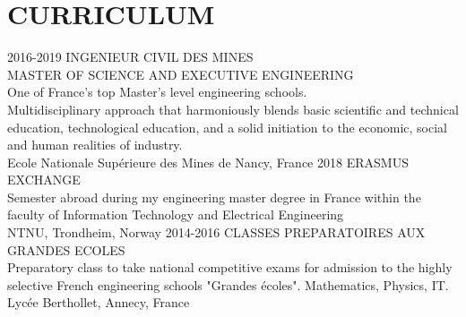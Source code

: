 \documentclass[]{cv-style}
\begin{document}
\section{CURRICULUM}
\begin{entrylist}
\entry
{2016-2019}
{INGENIEUR CIVIL DES MINES \\ MASTER OF SCIENCE AND EXECUTIVE ENGINEERING\\
{\normalfont 
    One of France's top Master’s level engineering schools. \\
    Multidisciplinary approach that harmoniously blends basic scientific and
    technical education, technological education, and a solid initiation to
    the economic, social and human realities of industry.\\
}}
{\vspace{-0.4cm}}
{ \small Ecole Nationale Supérieure des Mines 
de Nancy, France}
\entry
{2018}
{ERASMUS EXCHANGE \\
{\normalfont 
    Semester abroad during my engineering master degree in France within the
    faculty of Information Technology and Electrical Engineering\\
}}
{\vspace{-0.4cm}}
{ \small NTNU, Trondheim, Norway}
\entry
{2014-2016}
{CLASSES PREPARATOIRES AUX GRANDES ECOLES \\
{\normalfont 
    Preparatory class to take national competitive exams for admission to the
    highly selective French engineering schools "Grandes écoles". 
    Mathematics, Physics, IT.\\
}}
{\vspace{-0.4cm}}
{ \small Lycée Berthollet, Annecy, France}
%
\end{entrylist}
\end{document}
